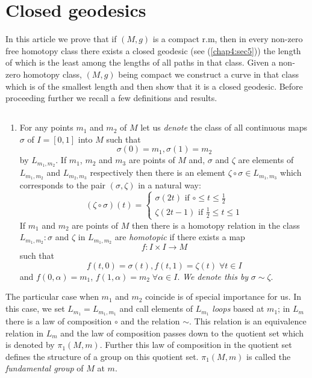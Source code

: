 \section{Closed geodesics}\label{chap7:sec6}

In this article we prove that if $(M,g)$ is a compact r.m, then in
every non-zero free homotopy class there exists a closed geodesic (see
(\ref{chap4:sec5})) the length of which is the least among the lengths of all
paths in that class. Given a non-zero homotopy class, $(M,g)$ being
compact we construct a curve in that class which is of the smallest
length and then show that it is a closed geodesic. Before proceeding
further we recall a few definitions and results. 

\subsection{}\label{chap7:7.6.1}\pageoriginale

\begin{enumerate}
\renewcommand{\labelenumi}{\theenumi)}
\item For any points $m_{1}$ and $m_{2}$ of $M$ let us {\em denote}
  the class of all continuous maps $\sigma$ of $I=[0,1]$ into $M$ such
  that
$$
\sigma(0)=m_{1},\sigma(1)=m_{2}
$$
by $L_{m_{1},m_{2}}$. If $m_{1}$, $m_{2}$ and $m_{3}$ are points of
$M$ and, $\sigma$ and $\zeta$ are elements of $L_{m_{1},m_{2}}$ and
$L_{m_{2},m_{3}}$ respectively then there is an element $\zeta\circ
\sigma\in L_{m_{1},m_{3}}$ which corresponds to the pair
$(\sigma,\zeta)$ in a natural way:
$$
(\zeta\circ\sigma)(t)=
\begin{cases}
\sigma(2t) \text{ if } \circ\leq t\leq \frac{1}{2}\\
\zeta(2t-1)\text{ if } \frac{1}{2}\leq t\leq 1
\end{cases}
$$
If $m_{1}$ and $m_{2}$ are points of $M$ then there is a homotopy
relation in the class $L_{m_{1},m_{2}}:\sigma$ and $\zeta$ in
$L_{m_{1},m_{2}}$ are {\em homotopic} if there exists a map
$$
f:I\times I\to M
$$
such that
$$
f(t,0)=\sigma(t),f(t,1)=\zeta(t) \; \forall t\in I
$$
and $f(0,\alpha)=m_{1}$, $f(1,\alpha)=m_{2} \; \forall \alpha\in I$. {\em
  We denote this by} $\sigma\sim \zeta$.
\end{enumerate}

The particular case when $m_{1}$ and $m_{2}$ coincide is of special
importance for us. In this case, we set $L_{m_{1}}=L_{m_{1},m_{1}}$
and call elements of $L_{m_{1}}$ {\em loops} based at $m_{1}$; in
$L_{m}$ there is a law of composition $\circ$ and the relation
$\sim$. This relation is an equivalence relation in $L_{m}$ and the
law of composition passes down to the quotient set which is denoted by
$\pi_{1}(M,m)$. Further this law of composition in the quotient set
defines the structure of a group on this quotient \pageoriginale
set. $\pi_{1}(M,m)$ is called the {\em fundamental group} of $M$ at
$m$. 

